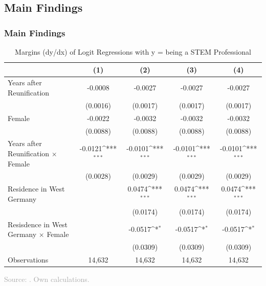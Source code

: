 \documentclass[11pt, aspectratio=1610, xcolor={dvipsnames}]{beamer}
\def\sym#1{\ifmmode^{#1}\else\(^{#1}\)\fi}
\begin{document}
	\subsection{Main Findings}
	\begin{frame}
		\frametitle{Main Findings}
		
		{\linespread{1}\tiny
			\begin{table}[h]
				\centering
				\caption{Margins (dy/dx) of Logit Regressions with y = being a STEM Professional}
				\label{tab:margins}
				\begin{tabular}{l*{4}{c}}
					\toprule
					&\multicolumn{1}{c}{(1)} & \multicolumn{1}{c}{(2)}         &\multicolumn{1}{c}{(3)} & \multicolumn{1}{c}{(4)} \\
					\midrule
					Years after Reunification & -0.0008 & -0.0027 & -0.0027 & -0.0027 \\
					& (0.0016) & (0.0017) & (0.0017) & (0.0017) \\
					\addlinespace
					Female & -0.0022  & -0.0032 & -0.0032 & -0.0032 \\
					& (0.0088) & (0.0088) & (0.0088) & (0.0088) \\
					\addlinespace
					Years after Reunification $\times$ Female &     -0.0121\sym{***}&     -0.0101\sym{***}&     -0.0101\sym{***} &     -0.0101\sym{***}\\
					&    (0.0028)         &    (0.0029)         &    (0.0029)         &    (0.0029) \\
					\addlinespace
					Residence in West Germany&                     &      0.0474\sym{***}&      0.0474\sym{***}&      0.0474\sym{***}\\
					&                     &    (0.0174)         &    (0.0174)         &    (0.0174)         \\
					\addlinespace
					Resisdence in West Germany $\times$ Female         &                     &     -0.0517\sym{*} & -0.0517\sym{*} & -0.0517\sym{*} \\
					& &    (0.0309)         &    (0.0309)         &    (0.0309) \\
					\midrule
					Observations        &       14,632         &       14,632         &       14,632         &       14,632         \\
					\bottomrule
				\end{tabular}
			\end{table}
		}
		
		{\scriptsize
			\textcolor{darkgray}{Source: \cite{SOEP2023}. Own calculations.}
		}
		
	\end{frame}
		
\end{document}

